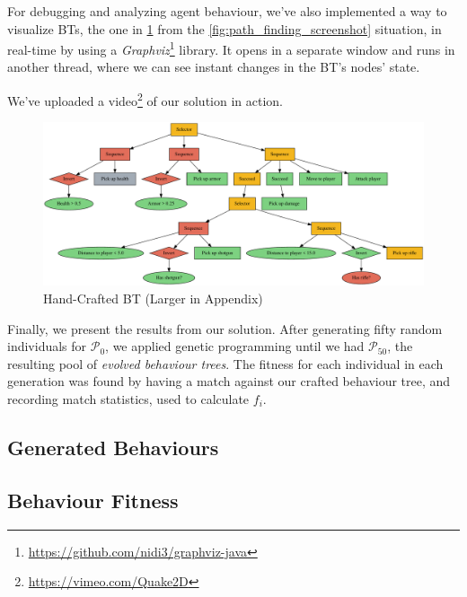 \documentclass[a4paper, twocolumn]{article}
\begin{document}
        For debugging and analyzing agent behaviour, we've also implemented a way to visualize BTs, the one in \cref{fig:hand_crafted_behaviour_tree} from the \cref{fig:path_finding_screenshot} situation, in real-time by using a \emph{Graphviz}\footnote{\url{https://github.com/nidi3/graphviz-java}} library. It opens in a separate window and runs in another thread, where we can see instant changes in the BT's nodes' state.

        We've uploaded a video\footnote{\url{https://vimeo.com/Quake2D}} of our solution in action.

        \begin{figure}[H]
            \centering
            \includegraphics[width=\linewidth]{share/hand_crafted_behaviour_tree.pdf}
            \caption{Hand-Crafted BT (Larger in Appendix)}
            \label{fig:hand_crafted_behaviour_tree}
        \end{figure}

        Finally, we present the results from our solution. After generating fifty random individuals for \(\mathcal{P}_0\), we applied genetic programming until we had \(\mathcal{P}_{50}\), the resulting pool of \emph{evolved behaviour trees}. The fitness for each individual in each generation was found by having a match against our crafted behaviour tree, and recording match statistics, used to calculate \(f_i\).

        \newpage

        \subsection{Generated Behaviours} \label{sec:generated_behaviours}



        \subsection{Behaviour Fitness} \label{sec:behaviour_fitness}
\end{document}
